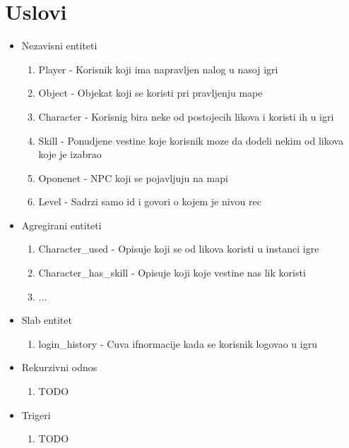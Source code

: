 \documentclass{article}
\begin{document}
\section {Uslovi}

\begin{itemize}
\item Nezavisni entiteti
	\begin{enumerate}
	\item Player - Korisnik koji ima napravljen nalog u nasoj igri
	\item Object - Objekat koji se koristi pri pravljenju mape
	\item Character - Korisnig bira neke od postojecih likova i koristi ih u igri
	\item Skill - Ponudjene vestine koje korisnik moze da dodeli nekim od likova koje je izabrao
	\item Oponenet - NPC koji se pojavljuju na mapi
	\item Level - Sadrzi samo id i govori o kojem je nivou rec
	\end{enumerate}

\item Agregirani entiteti
	\begin{enumerate}
	\item Character\_used - Opisuje koji se od likova koristi u instanci igre
	\item Character\_has\_skill - Opisuje koji koje vestine nas lik koristi
	\item ...
	\end{enumerate}

\item Slab entitet
	\begin{enumerate}
	\item login\_history - Cuva ifnormacije kada se korisnik logovao u igru
	\end{enumerate}

\item Rekurzivni odnos
	\begin{enumerate}
	\item TODO
	\end{enumerate}

\item Trigeri
	\begin{enumerate}
	\item TODO
	\end{enumerate}

\end{itemize}
\end{document}
